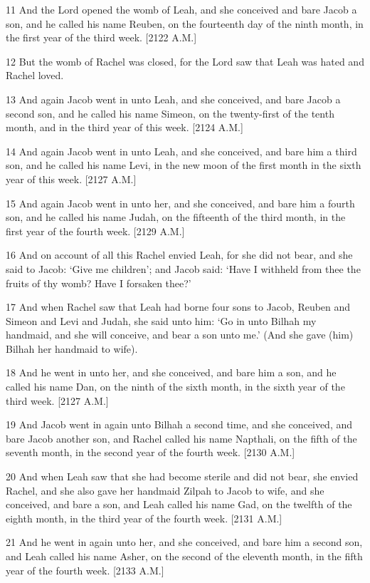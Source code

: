 \par 11 And the Lord opened the womb of Leah, and she conceived and bare Jacob a son, and he called his name Reuben, on the fourteenth day of the ninth month, in the first year of the third week. [2122 A.M.]
\par 12 But the womb of Rachel was closed, for the Lord saw that Leah was hated and Rachel loved.
\par 13 And again Jacob went in unto Leah, and she conceived, and bare Jacob a second son, and he called his name Simeon, on the twenty-first of the tenth month, and in the third year of this week. [2124 A.M.]
\par 14 And again Jacob went in unto Leah, and she conceived, and bare him a third son, and he called his name Levi, in the new moon of the first month in the sixth year of this week. [2127 A.M.]
\par 15 And again Jacob went in unto her, and she conceived, and bare him a fourth son, and he called his name Judah, on the fifteenth of the third month, in the first year of the fourth week. [2129 A.M.]
\par 16 And on account of all this Rachel envied Leah, for she did not bear, and she said to Jacob: ‘Give me children’; and Jacob said: ‘Have I withheld from thee the fruits of thy womb? Have I forsaken thee?’
\par 17 And when Rachel saw that Leah had borne four sons to Jacob, Reuben and Simeon and Levi and Judah, she said unto him: ‘Go in unto Bilhah my handmaid, and she will conceive, and bear a son unto me.’ (And she gave (him) Bilhah her handmaid to wife).
\par 18 And he went in unto her, and she conceived, and bare him a son, and he called his name Dan, on the ninth of the sixth month, in the sixth year of the third week. [2127 A.M.]
\par 19 And Jacob went in again unto Bilhah a second time, and she conceived, and bare Jacob another son, and Rachel called his name Napthali, on the fifth of the seventh month, in the second year of the fourth week. [2130 A.M.]
\par 20 And when Leah saw that she had become sterile and did not bear, she envied Rachel, and she also gave her handmaid Zilpah to Jacob to wife, and she conceived, and bare a son, and Leah called his name Gad, on the twelfth of the eighth month, in the third year of the fourth week. [2131 A.M.]
\par 21 And he went in again unto her, and she conceived, and bare him a second son, and Leah called his name Asher, on the second of the eleventh month, in the fifth year of the fourth week. [2133 A.M.]
